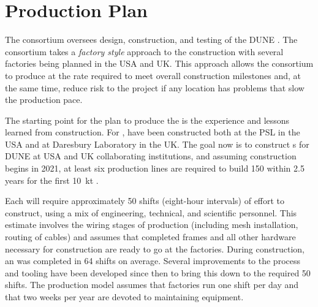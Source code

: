 \section{Production Plan}
\label{sec:fdsp-apa-prod}



The  consortium oversees design, construction, and testing of the DUNE  . %
The  consortium takes a \textit{factory style} approach to the construction with several factories being planned in the USA and UK. This approach allows the consortium to produce  at the rate required to meet overall construction milestones and, at the same time, reduce risk to the project if any location has problems that slow the production pace.

The starting point for the  plan to produce the  is the experience and lessons learned from  construction. For ,  have been constructed both at the PSL in the USA and at Daresbury Laboratory in the UK.  The goal now is to construct s for DUNE at USA and UK collaborating institutions, and assuming construction begins in 2021, at least six production lines are required to build \num{150}  within \num{2.5} years for the first %
\SI{10}{kt} .   

Each  will require approximately \num{50} shifts (eight-hour intervals) of effort to construct, using a mix of engineering, technical, and scientific personnel. This estimate involves the wiring stages of production (including mesh installation, routing of  cables) and assumes that completed frames and all other hardware necessary for construction are ready to go at the factories. During  construction, an  was completed in \num{64} shifts on average. Several improvements to the process and tooling have been developed since then to bring this down to the required \num{50} shifts. The production model assumes that factories run one shift per day and that two weeks per year are devoted to maintaining equipment. 

